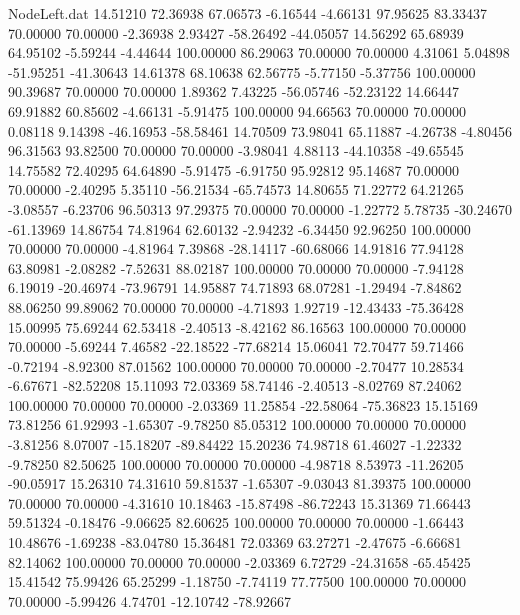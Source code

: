 \begin{filecontents}{NodeLeft.dat}
  14.51210   72.36938   67.06573    -6.16544   -4.66131   97.95625   83.33437   70.00000   70.00000   -2.36938    2.93427  -58.26492  -44.05057
  14.56292   65.68939   64.95102    -5.59244   -4.44644  100.00000   86.29063   70.00000   70.00000    4.31061    5.04898  -51.95251  -41.30643
  14.61378   68.10638   62.56775    -5.77150   -5.37756  100.00000   90.39687   70.00000   70.00000    1.89362    7.43225  -56.05746  -52.23122
  14.66447   69.91882   60.85602    -4.66131   -5.91475  100.00000   94.66563   70.00000   70.00000    0.08118    9.14398  -46.16953  -58.58461
  14.70509   73.98041   65.11887    -4.26738   -4.80456   96.31563   93.82500   70.00000   70.00000   -3.98041    4.88113  -44.10358  -49.65545
  14.75582   72.40295   64.64890    -5.91475   -6.91750   95.92812   95.14687   70.00000   70.00000   -2.40295    5.35110  -56.21534  -65.74573
  14.80655   71.22772   64.21265    -3.08557   -6.23706   96.50313   97.29375   70.00000   70.00000   -1.22772    5.78735  -30.24670  -61.13969
  14.86754   74.81964   62.60132    -2.94232   -6.34450   92.96250  100.00000   70.00000   70.00000   -4.81964    7.39868  -28.14117  -60.68066
  14.91816   77.94128   63.80981    -2.08282   -7.52631   88.02187  100.00000   70.00000   70.00000   -7.94128    6.19019  -20.46974  -73.96791
  14.95887   74.71893   68.07281    -1.29494   -7.84862   88.06250   99.89062   70.00000   70.00000   -4.71893    1.92719  -12.43433  -75.36428
  15.00995   75.69244   62.53418    -2.40513   -8.42162   86.16563  100.00000   70.00000   70.00000   -5.69244    7.46582  -22.18522  -77.68214
  15.06041   72.70477   59.71466    -0.72194   -8.92300   87.01562  100.00000   70.00000   70.00000   -2.70477   10.28534   -6.67671  -82.52208
  15.11093   72.03369   58.74146    -2.40513   -8.02769   87.24062  100.00000   70.00000   70.00000   -2.03369   11.25854  -22.58064  -75.36823
  15.15169   73.81256   61.92993    -1.65307   -9.78250   85.05312  100.00000   70.00000   70.00000   -3.81256    8.07007  -15.18207  -89.84422
  15.20236   74.98718   61.46027    -1.22332   -9.78250   82.50625  100.00000   70.00000   70.00000   -4.98718    8.53973  -11.26205  -90.05917
  15.26310   74.31610   59.81537    -1.65307   -9.03043   81.39375  100.00000   70.00000   70.00000   -4.31610   10.18463  -15.87498  -86.72243
  15.31369   71.66443   59.51324    -0.18476   -9.06625   82.60625  100.00000   70.00000   70.00000   -1.66443   10.48676   -1.69238  -83.04780
  15.36481   72.03369   63.27271    -2.47675   -6.66681   82.14062  100.00000   70.00000   70.00000   -2.03369    6.72729  -24.31658  -65.45425
  15.41542   75.99426   65.25299    -1.18750   -7.74119   77.77500  100.00000   70.00000   70.00000   -5.99426    4.74701  -12.10742  -78.92667

\end{filecontents}
